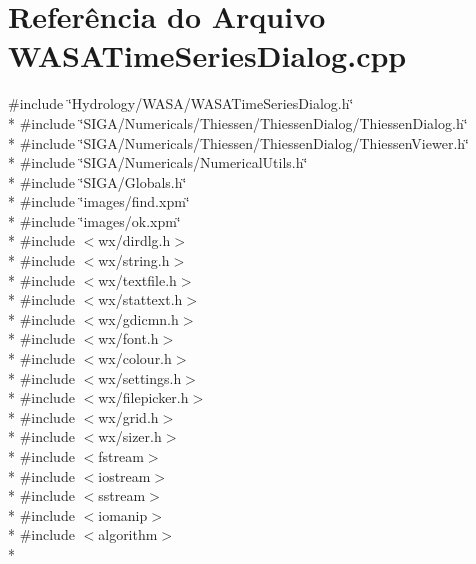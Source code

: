 \section{Referência do Arquivo W\+A\+S\+A\+Time\+Series\+Dialog.\+cpp}
\label{_w_a_s_a_time_series_dialog_8cpp}
{\ttfamily \#include \char`\"{}Hydrology/\+W\+A\+S\+A/\+W\+A\+S\+A\+Time\+Series\+Dialog.\+h\char`\"{}}\\*
{\ttfamily \#include \char`\"{}S\+I\+G\+A/\+Numericals/\+Thiessen/\+Thiessen\+Dialog/\+Thiessen\+Dialog.\+h\char`\"{}}\\*
{\ttfamily \#include \char`\"{}S\+I\+G\+A/\+Numericals/\+Thiessen/\+Thiessen\+Dialog/\+Thiessen\+Viewer.\+h\char`\"{}}\\*
{\ttfamily \#include \char`\"{}S\+I\+G\+A/\+Numericals/\+Numerical\+Utils.\+h\char`\"{}}\\*
{\ttfamily \#include \char`\"{}S\+I\+G\+A/\+Globals.\+h\char`\"{}}\\*
{\ttfamily \#include \char`\"{}images/find.\+xpm\char`\"{}}\\*
{\ttfamily \#include \char`\"{}images/ok.\+xpm\char`\"{}}\\*
{\ttfamily \#include $<$wx/dirdlg.\+h$>$}\\*
{\ttfamily \#include $<$wx/string.\+h$>$}\\*
{\ttfamily \#include $<$wx/textfile.\+h$>$}\\*
{\ttfamily \#include $<$wx/stattext.\+h$>$}\\*
{\ttfamily \#include $<$wx/gdicmn.\+h$>$}\\*
{\ttfamily \#include $<$wx/font.\+h$>$}\\*
{\ttfamily \#include $<$wx/colour.\+h$>$}\\*
{\ttfamily \#include $<$wx/settings.\+h$>$}\\*
{\ttfamily \#include $<$wx/filepicker.\+h$>$}\\*
{\ttfamily \#include $<$wx/grid.\+h$>$}\\*
{\ttfamily \#include $<$wx/sizer.\+h$>$}\\*
{\ttfamily \#include $<$fstream$>$}\\*
{\ttfamily \#include $<$iostream$>$}\\*
{\ttfamily \#include $<$sstream$>$}\\*
{\ttfamily \#include $<$iomanip$>$}\\*
{\ttfamily \#include $<$algorithm$>$}\\*
